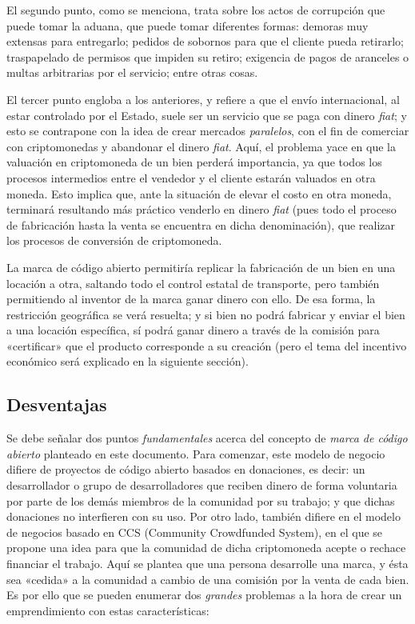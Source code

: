\documentclass[12pt,a4paper]{article}
\begin{document}
El segundo punto, como se menciona, trata sobre los actos de corrupción que puede tomar la aduana, que puede tomar diferentes formas: demoras muy extensas para entregarlo; pedidos de sobornos para que el cliente pueda retirarlo; traspapelado de permisos que impiden su retiro; exigencia de pagos de aranceles o multas arbitrarias por el servicio; entre otras cosas.

El tercer punto engloba a los anteriores, y refiere a que el envío internacional, al estar controlado por el Estado, suele ser un servicio que se paga con dinero \textit{fiat}; y esto se contrapone con la idea de crear mercados \textit{paralelos}, con el fin de comerciar con criptomonedas y abandonar el dinero \textit{fiat}. Aquí, el problema yace en que la valuación en criptomoneda de un bien perderá importancia, ya que todos los procesos intermedios entre el vendedor y el cliente estarán valuados en otra moneda. Esto implica que, ante la situación de elevar el costo en otra moneda, terminará resultando más práctico venderlo en dinero \textit{fiat} (pues todo el proceso de fabricación hasta la venta se encuentra en dicha denominación), que realizar los procesos de conversión de criptomoneda.

La marca de código abierto permitiría replicar la fabricación de un bien en una locación a otra, saltando todo el control estatal de transporte, pero también permitiendo al inventor de la marca ganar dinero con ello. De esa forma, la restricción geográfica se verá resuelta; y si bien no podrá fabricar y enviar el bien a una locación específica, sí podrá ganar dinero a través de la comisión para «certificar» que el producto corresponde a su creación (pero el tema del incentivo económico será explicado en la siguiente sección).

\subsection{Desventajas}
Se debe señalar dos puntos \textit{fundamentales} acerca del concepto de \textit{marca de código abierto} planteado en este documento. Para comenzar, este modelo de negocio difiere de proyectos de código abierto basados en donaciones, es decir: un desarrollador o grupo de desarrolladores que reciben dinero de forma voluntaria por parte de los demás miembros de la comunidad por su trabajo; y que dichas donaciones no interfieren con su uso. Por otro lado, también difiere en el modelo de negocios basado en CCS (Community Crowdfunded System), en el que se propone una idea para que la comunidad de dicha criptomoneda acepte o rechace financiar el trabajo. Aquí se plantea que una persona desarrolle una marca, y ésta sea «cedida» a la comunidad a cambio de una comisión por la venta de cada bien. Es por ello que se pueden enumerar dos \textit{grandes} problemas a la hora de crear un emprendimiento con estas características:
\end{document}
